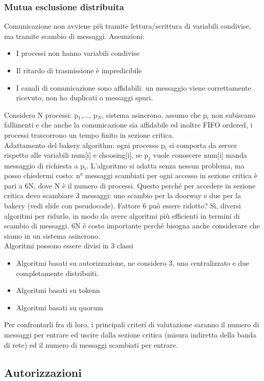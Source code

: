 \documentclass{article}
\begin{document}
\subsubsection{Mutua esclusione distribuita}
Comunicazione non avviene più tramite lettura/scrittura di variabili condivise, ma tramite scambio di messaggi. Assunzioni:
\begin{itemize}
\item I processi non hanno variabili condivise
\item Il ritardo di trasmissione è impredicibile
\item I canali di comunicazione sono affidabili: un messaggio viene correttamente ricevuto, non ho duplicati o messaggi spuri.
\end{itemize}
Considero N processi: p$_1$,..., p$_N$, sistema asincrono, assumo che p$_i$ non subiscano fallimenti e che anche la comunicazione sia affidabile ed inoltre FIFO ordered, i processi trascorrono un tempo finito in sezione critica.\\ Adattamento del bakery algorithm: ogni processo p$_i$ si comporta da server rispetto alle variabili num[i] e choosing[i], se p$_j$ vuole conoscere num[i] manda messaggio di richiesta a p$_i$. L'algoritmo si adatta senza nessun problema, ma posso chiedermi costo: n° messaggi scambiati per ogni accesso in sezione critica è  pari a 6N, dove N è il numero di processi. Questo perché per accedere in sezione critica devo scambiare 3 messaggi: uno scambio per la doorway e due per la bakery (vedi slide con pseudocode). Fattore 6 può essere ridotto? Sì, diversi algoritmi per ridurlo, in modo da avere algoritmi più efficienti in termini di scambio di messaggi. 6N è costo importante perché bisogna anche considerare che siamo in un sistema asincrono.\\ Algoritmi possono essere divisi in 3 classi
\begin{itemize}
\item Algoritmi basati su autorizzazione, ne considero 3, uno centralizzato e due completamente distribuiti.
\item Algoritmi basati su tokenn
\item Algoritmi basati su quorum
\end{itemize} Per confrontarli fra di loro, i principali criteri di valutazione saranno il numero di messaggi per entrare ed uscire dalla sezione critica (misura indiretta della banda di rete) ed il numero di messaggi scambiati per entrare.
\subsection{Autorizzazioni}
\end{document}
